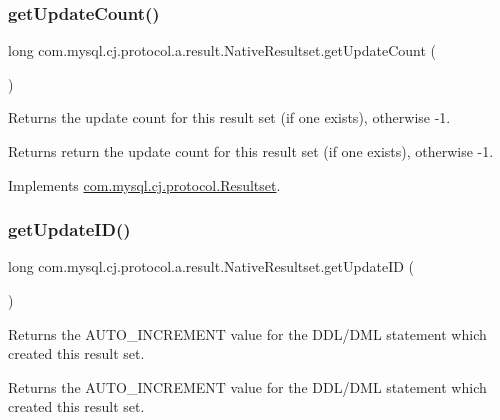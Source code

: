 \subsubsection{\texorpdfstring{get\+Update\+Count()}{getUpdateCount()}}
{\footnotesize\ttfamily long com.\+mysql.\+cj.\+protocol.\+a.\+result.\+Native\+Resultset.\+get\+Update\+Count (\begin{DoxyParamCaption}{ }\end{DoxyParamCaption})}

Returns the update count for this result set (if one exists), otherwise -\/1.

\begin{DoxyReturn}{Returns}
return the update count for this result set (if one exists), otherwise -\/1. 
\end{DoxyReturn}


Implements \mbox{\hyperlink{interfacecom_1_1mysql_1_1cj_1_1protocol_1_1_resultset_a72a3e90cf2affd2bbc8826a2c2e39df9}{com.\+mysql.\+cj.\+protocol.\+Resultset}}.

\mbox{\label{classcom_1_1mysql_1_1cj_1_1protocol_1_1a_1_1result_1_1_native_resultset_ac6a7ec2cf40f503d0978cb3a03a26b66}} 
\subsubsection{\texorpdfstring{get\+Update\+I\+D()}{getUpdateID()}}
{\footnotesize\ttfamily long com.\+mysql.\+cj.\+protocol.\+a.\+result.\+Native\+Resultset.\+get\+Update\+ID (\begin{DoxyParamCaption}{ }\end{DoxyParamCaption})}

Returns the A\+U\+T\+O\+\_\+\+I\+N\+C\+R\+E\+M\+E\+NT value for the D\+D\+L/\+D\+ML statement which created this result set.

\begin{DoxyReturn}{Returns}
the A\+U\+T\+O\+\_\+\+I\+N\+C\+R\+E\+M\+E\+NT value for the D\+D\+L/\+D\+ML statement which created this result set. 
\end{DoxyReturn}


